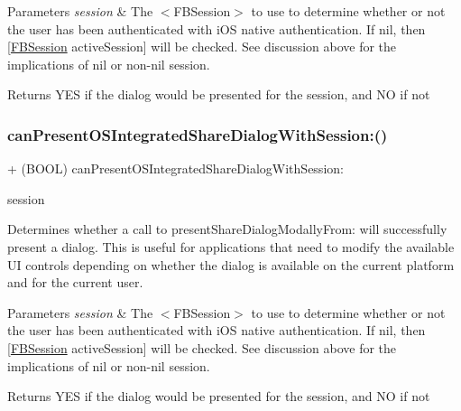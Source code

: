 \begin{DoxyParams}{Parameters}
{\em session} & The $<$\+F\+B\+Session$>$ to use to determine whether or not the user has been authenticated with i\+OS native authentication. If nil, then \mbox{[}\hyperlink{interfaceFBSession}{F\+B\+Session} active\+Session\mbox{]} will be checked. See discussion above for the implications of nil or non-\/nil session.\\
\hline
\end{DoxyParams}
\begin{DoxyReturn}{Returns}
Y\+ES if the dialog would be presented for the session, and NO if not 
\end{DoxyReturn}
\mbox{\label{interfaceFBDialogs_a268b4ee8ee491e006770a51cefa36eeb}} 
\subsubsection{\texorpdfstring{can\+Present\+O\+S\+Integrated\+Share\+Dialog\+With\+Session\+:()}{canPresentOSIntegratedShareDialogWithSession:()}\hspace{0.1cm}{\footnotesize\ttfamily [5/5]}}
{\footnotesize\ttfamily + (B\+O\+OL) can\+Present\+O\+S\+Integrated\+Share\+Dialog\+With\+Session\+: \begin{DoxyParamCaption}\item[{(\hyperlink{interfaceFBSession}{F\+B\+Session} $\ast$)}]{session }\end{DoxyParamCaption}}

Determines whether a call to present\+Share\+Dialog\+Modally\+From\+: will successfully present a dialog. This is useful for applications that need to modify the available UI controls depending on whether the dialog is available on the current platform and for the current user.


\begin{DoxyParams}{Parameters}
{\em session} & The $<$\+F\+B\+Session$>$ to use to determine whether or not the user has been authenticated with i\+OS native authentication. If nil, then \mbox{[}\hyperlink{interfaceFBSession}{F\+B\+Session} active\+Session\mbox{]} will be checked. See discussion above for the implications of nil or non-\/nil session.\\
\hline
\end{DoxyParams}
\begin{DoxyReturn}{Returns}
Y\+ES if the dialog would be presented for the session, and NO if not 
\end{DoxyReturn}
\mbox{\label{interfaceFBDialogs_a017ecb9200d66140929cce227723a4d5}} 
